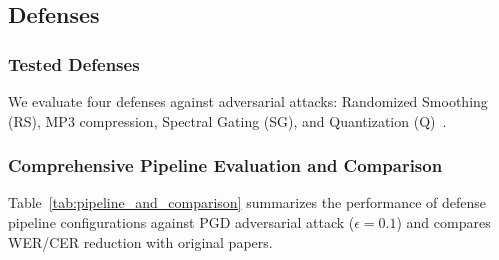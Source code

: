 \documentclass[conference]{IEEEtran}
\begin{document}
\subsection{Defenses}
\subsubsection{Tested Defenses}
We evaluate four defenses against adversarial attacks: Randomized Smoothing (RS), MP3 compression, Spectral Gating (SG), and Quantization (Q)~\cite{zelasko2021adversarial, li2024adaptive, olivier2022sequential, andronic2020mp3, oreilly2022voiceblock, li2024investigating}.

\subsubsection{Comprehensive Pipeline Evaluation and Comparison}
Table~\ref{tab:pipeline_and_comparison} summarizes the performance of defense pipeline configurations against PGD adversarial attack (\(\epsilon = 0.1\)) and compares WER/CER reduction with original papers.
\end{document}
